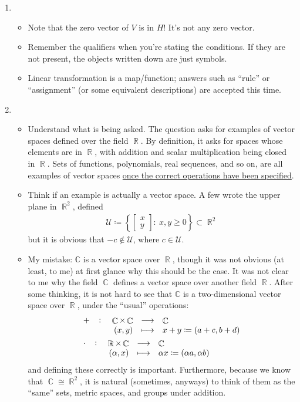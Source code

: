 \documentclass[answers,11pt]{exam}
\theoremstyle{definition}
\DeclareMathOperator{\R}{\mathbb{R}}
\DeclareMathOperator{\Com}{\mathbb{C}}
\DeclareMathOperator{\1}{\mathbbm{1}}
\renewcommand{\geq}{\geqslant}
\newcommand{\condset}[4]{\left\{ #1  : \: #2 #3 #4 \right\}}
\begin{document}
\begin{enumerate}
	\item \begin{itemize}
		\item Note that the zero vector of $V$ is in $H$! It's not any zero vector.
		\item Remember the qualifiers when you're stating the conditions. If they are not present, the objects written down are just symbols.
		\item Linear transformation is a map/function; answers such as ``rule'' or ``assignment'' (or some equivalent descriptions) are accepted this time.
	\end{itemize}
	
	
	\item \begin{itemize}
		\item Understand what is being asked. The question asks for examples of vector spaces defined over the field $\R$. By definition, it asks for spaces whose elements are in $\R$, with addition and scalar multiplication being closed in $\R$. Sets of functions, polynomials, real sequences, and so on, are all examples of vector spaces \uline{once the correct operations have been specified}.
		
		\item Think if an example is actually a vector space. A few wrote the upper plane in $\R^2$, defined
		\begin{align*}
		\mathcal{U} \coloneqq \condset{ \begin{bmatrix}
			x \\ y
			\end{bmatrix}}{x,y}{\geq}{0} \subset \R^2
		\end{align*}
		but it is obvious that $-c \notin \mathcal{U}$, where $c \in \mathcal{U}$.
		
		\item My mistake: $\mathbb{C}$ is a vector space over $\R$, though it was not obvious (at least, to me) at first glance why this should be the case. It was not clear to me why the field $\Com$ defines a vector space over another field $\R$. After some thinking, it is not hard to see that $\mathbb{C}$ is a two-dimensional vector space over $\R$, under the ``usual'' operations:
		\begin{align*}
		&\fullfunction{+}{\Com \times \Com}{\Com}{(x,y)}{x+y \coloneqq (a+c,b+d)} \\
		&\fullfunction{\cdot}{\R \times \Com}{\Com}{(\alpha,x)}{\alpha x \coloneqq (\alpha a, \alpha b)}
		\end{align*} 
		and defining these correctly is important. Furthermore, because we know that $\Com \cong \R^2$, it is natural (sometimes, anyways) to think of them as the ``same'' sets, metric spaces, and groups under addition.
		

\end{itemize}
\end{enumerate}
\end{document}
